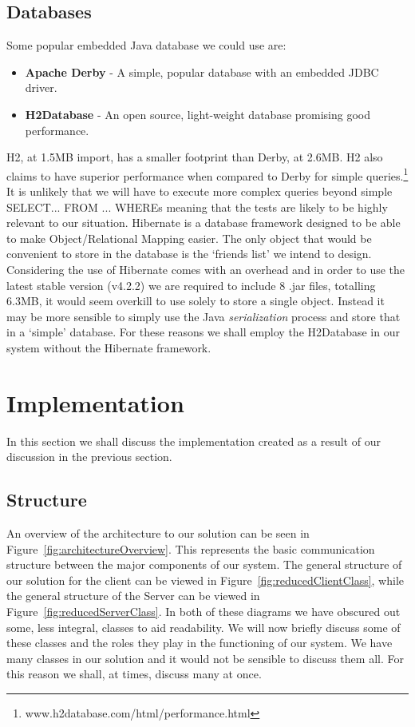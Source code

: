 \documentclass[12pt, titlepage]{article}
\begin{document}
\subsection{Databases}
Some popular embedded Java database we could use are:
\begin{itemize}
	\item \textbf{Apache Derby} - A simple, popular database with an embedded JDBC driver.
	\item \textbf{H2Database} - An open source, light-weight database promising good performance.
\end{itemize}
H2, at 1.5MB import, has a smaller footprint than Derby,  at 2.6MB. H2 also claims to have superior performance when compared to Derby for simple queries.\footnote{www.h2database.com/html/performance.html} It is unlikely that we will have to execute more complex queries beyond simple SELECT... FROM ... WHEREs meaning that the tests are likely to be highly relevant to our situation.
\newline \indent Hibernate is a database framework designed to be able to make Object/Relational Mapping easier. The only object that would be convenient to store in the database is the `friends list' we intend to design. Considering the use of Hibernate comes with an overhead and in order to use the latest stable version (v4.2.2) we are required to include 8 .jar files, totalling 6.3MB, it would seem overkill to use solely to store a single object. Instead it may be more sensible to simply use the Java \textit{serialization} process and store that in a `simple' database.
\newline \indent For these reasons we shall employ the H2Database in our system without the Hibernate framework.

\newpage
\section{Implementation}
In this section we shall discuss the implementation created as a result of our discussion in the previous section.
\subsection{Structure}
An overview of the architecture to our solution can be seen in Figure~\ref{fig:architectureOverview}. This represents the basic communication structure between the major components of our system.
\newline \indent The general structure of our solution for the client can be viewed in Figure~\ref{fig:reducedClientClass}, while the general structure of the Server can be viewed in Figure~\ref{fig:reducedServerClass}. In both of these diagrams we have obscured out some, less integral, classes to aid readability.
\newline \indent We will now briefly discuss some of these classes and the roles they play in the functioning of our system. We have many classes in our solution and it would not be sensible to discuss them all. For this reason we shall, at times, discuss many at once.
 
\end{document}
